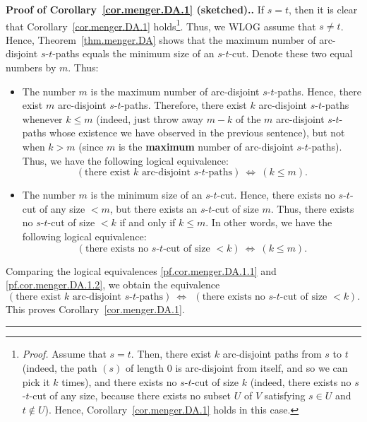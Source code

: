 \documentclass[numbers=enddot,12pt,final,onecolumn,notitlepage]{scrartcl}%
\theoremstyle{definition}
\newenvironment{proof}[1][Proof]{\noindent\textbf{#1.} }{\ \rule{0.5em}{0.5em}}
\newcommand{\tup}[1]{\left( #1 \right)}
\begin{document}
\begin{proof}[Proof of Corollary~\ref{cor.menger.DA.1} (sketched).]
If $s = t$, then it is clear that Corollary~\ref{cor.menger.DA.1}
holds\footnote{\textit{Proof.}
  Assume that $s = t$.
  Then, there exist $k$ arc-disjoint paths from $s$ to $t$
  (indeed, the path $\tup{s}$ of length $0$ is arc-disjoint from
  itself, and so we can pick it $k$ times),
  and there exists no $s$-$t$-cut of size $k$ (indeed, there exists
  no $s$-$t$-cut of any size, because there exists no
  subset $U$ of $V$ satisfying $s \in U$ and $t \notin U$).
  Hence, Corollary~\ref{cor.menger.DA.1} holds in this case.}.
Thus, we WLOG assume that $s \neq t$.
Hence, Theorem~\ref{thm.menger.DA} shows that the maximum number of
arc-disjoint $s$-$t$-paths equals the minimum size of an $s$-$t$-cut.
Denote these two equal numbers by $m$.
Thus:

\begin{itemize}

\item The number $m$ is the maximum number of arc-disjoint
      $s$-$t$-paths.
      Hence, there exist $m$ arc-disjoint $s$-$t$-paths.
      Therefore, there exist $k$ arc-disjoint $s$-$t$-paths whenever
      $k \leq m$ (indeed, just throw away $m-k$ of the $m$
      arc-disjoint $s$-$t$-paths whose existence we have observed in
      the previous sentence), but not when $k > m$
      (since $m$ is the \textbf{maximum} number of arc-disjoint
      $s$-$t$-paths).
      Thus, we have the following logical equivalence:
      \begin{equation}
      \tup{\text{there exist } k \text{ arc-disjoint }
           s\text{-}t\text{-paths}}
      \ \Longleftrightarrow \  \tup{k \leq m} .
      \label{pf.cor.menger.DA.1.1}
      \end{equation}

\item The number $m$ is the minimum size of an $s$-$t$-cut.
      Hence, there exists no $s$-$t$-cut of any size $< m$, but there
      exists an $s$-$t$-cut of size $m$.
      Thus, there exists no $s$-$t$-cut of size $< k$ if and only
      if $k \leq m$.
      In other words, we have the following logical equivalence:
      \begin{equation}
      \tup{\text{there exists no } s\text{-}t\text{-cut of size }
           < k}
      \ \Longleftrightarrow \  \tup{k \leq m} .
      \label{pf.cor.menger.DA.1.2}
      \end{equation}

\end{itemize}

Comparing the logical equivalences \eqref{pf.cor.menger.DA.1.1} and
\eqref{pf.cor.menger.DA.1.2}, we obtain the equivalence
\[
\tup{\text{there exist } k \text{ arc-disjoint }
           s\text{-}t\text{-paths}}
\ \Longleftrightarrow \  \  %
\tup{\text{there exists no } s\text{-}t\text{-cut of size }
           < k} .
\]
This proves Corollary~\ref{cor.menger.DA.1}.
\end{proof}
\end{document}
